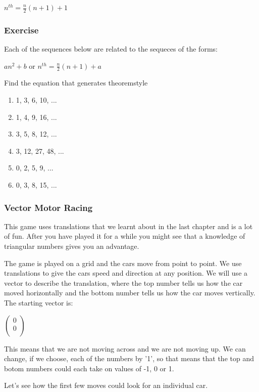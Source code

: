 \bigskip
  $\displaystyle n^{th}=\frac{n}{2}(n + 1) + 1$
\bigskip

\subsubsection{Exercise}
Each of the sequences below are related to the sequeces of the forms:

$an^2 + b$ or $\displaystyle n^{th}=\frac{n}{2}(n + 1) + a$

Find the equation that generates theoremstyle

\begin{enumerate}
  \item 1, 3, 6, 10, ...
  \item 1, 4, 9, 16, ...
  \item 3, 5, 8, 12, ...
  \item 3, 12, 27, 48, ...
  \item 0, 2, 5, 9, ...
  \item 0, 3, 8, 15, ...
\end{enumerate}

\subsubsection{Vector Motor Racing}
This game uses translations that we learnt about in the last chapter and is a lot of fun.  After you have played it for a while you might see that a knowledge of triangular numbers gives you an advantage.

The game is played on a grid and the cars move from point to point.  We use translations to give the cars speed and direction at any position.  We will use a vector to describe the translation, where the top number tells us how the car moved horizontally and the bottom number tells us how the car moves vertically.  The starting vector is:

\bigskip

$\left(
\begin{array}{c}
0\\
0\\
\end{array}
\right)$

\bigskip

This means that we are not moving across and we are not moving up.  We can change, if we choose, each of the numbers by '1', so that means that the top and botom numbers could each take on values of -1, 0 or 1.

Let's see how the first few moves could look for an individual car.

